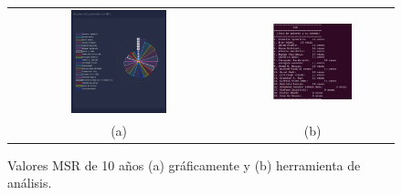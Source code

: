 \documentclass[a4paper, 12pt]{book}
\begin{document}
\begin{figure}[!h]
    \centering
    \begin{tabular}{cc}
    \includegraphics[width=0.45\textwidth]{img/msr_10_year_graph.png} &  
    \includegraphics[width=0.52\textwidth]{img/msr_10_year.png} \\ 
    (a) &(b) 
    \end{tabular}
    \caption{Valores MSR de 10 años (a) gráficamente y (b) herramienta de análisis.}
    \label{fig:comp_msr_10_year}
\end{figure}
\end{document}
